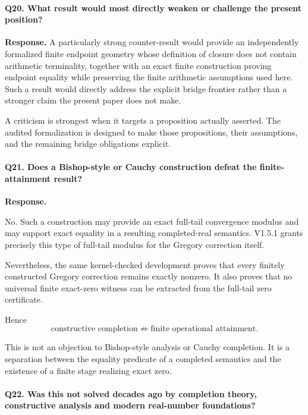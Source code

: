 \documentclass[11pt,a4paper]{article}
\begin{document}
\paragraph{Q20. What result would most directly weaken or challenge the present position?}

\textbf{Response.}
A particularly strong counter-result would provide an independently
formalized finite endpoint geometry whose definition of closure does
not contain arithmetic terminality, together with an exact finite
construction proving endpoint equality while preserving the finite
arithmetic assumptions used here. Such a result would directly address
the explicit bridge frontier rather than a stronger claim the present
paper does not make.

\medskip

A criticism is strongest when it targets a proposition actually
asserted. The audited formalization is designed to make those
propositions, their assumptions, and the remaining bridge obligations
explicit.





\paragraph{Q21. Does a Bishop-style or Cauchy construction defeat the finite-attainment result?}

\textbf{Response.}

No.  Such a construction may provide an exact full-tail convergence
modulus and may support exact equality in a resulting completed-real
semantics.  V1.5.1 grants precisely this type of full-tail modulus for
the Gregory correction itself.

Nevertheless, the same kernel-checked development proves that every
finitely constructed Gregory correction remains exactly nonzero.  It
also proves that no universal finite exact-zero witness can be
extracted from the full-tail zero certificate.

Hence
\[
\boxed{
\text{constructive completion}
\not\Rightarrow
\text{finite operational attainment}.
}
\]

This is not an objection to Bishop-style analysis or Cauchy completion.
It is a separation between the equality predicate of a completed
semantics and the existence of a finite stage realizing exact zero.



\paragraph{Q22. Was this not solved decades ago by completion theory,
constructive analysis and modern real-number foundations?}
\end{document}
